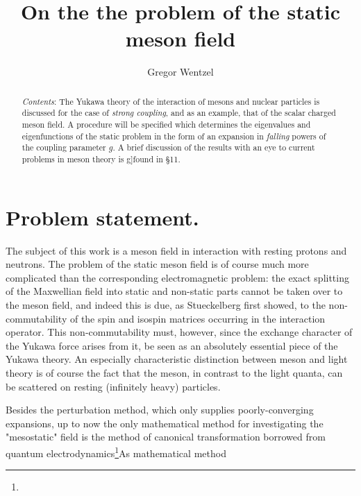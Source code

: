\begin{paper}{1}
\begin{header}
\title{On the the problem of the static meson field}
\author{Gregor Wentzel}
\makeheader
\end{header}


\begin{abstract}
\textit{Contents}: The Yukawa theory of the interaction of mesons and nuclear particles is discussed for the case of \textit{strong coupling}, and as an example, that of the scalar charged meson field. A procedure will be specified which determines the eigenvalues and eigenfunctions of the static problem in the form of an expansion in \textit{falling} powers of the coupling parameter $g$. A brief discussion of the results with an eye to current problems in meson theory is g]found in \S11.
\end{abstract}

\section{Problem statement.}

The subject of this work is a meson field in interaction with resting protons and neutrons. The problem of the static meson field is of course much more complicated than the corresponding electromagnetic problem: the exact splitting of the Maxwellian field into static and non-static parts cannot be taken over to the meson field, and indeed this is due, as Stueckelberg first showed, to the non-commutability of  the spin and isospin matrices occurring in the interaction operator. This non-commutability must, however, since the exchange character of the Yukawa force arises from it, be seen as an absolutely essential piece of the Yukawa theory. An especially characteristic distinction between meson and light theory is of course the fact that the meson, in contrast to the light quanta, can be scattered on resting (infinitely heavy) particles.

Besides the perturbation method, which only supplies poorly-converging expansions, up to now the only mathematical method for investigating the "mesostatic" field is the method of canonical transformation borrowed from quantum electrodynamics\footnote{}As mathematical method

\end{paper}